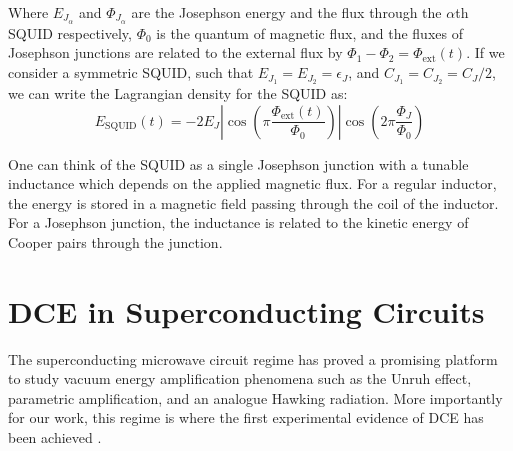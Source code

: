 \noindent
Where $E_{J_\alpha}$ and $\Phi_{J_\alpha}$ are the Josephson energy and the flux through the $\alpha$th SQUID respectively, $\Phi_0$ is the quantum of magnetic flux, and the fluxes of Josephson junctions are related to the external flux by $\Phi_1 - \Phi_2  = \Phi_{\text{ext}}(t)$. If we consider a symmetric SQUID, such that $E_{J_1} = E_{J_2} = \epsilon_J$, and
$C_{J_1} = C_{J_2} = C_J/2$, we can write the Lagrangian density for the SQUID as:
%
\begin{equation}\label{eq:squid_energy_symm}
    E_{\text{SQUID}}(t) = -2E_J \left|\cos\left(\pi\frac{\Phi_{\text{ext}}(t)}{\Phi_0}\right)\right|
    \cos\left(2\pi \frac{\Phi_J}{\Phi_0} \right)
\end{equation}

\newpage
\noindent
One can think of the SQUID as a single Josephson junction with a tunable inductance which depends on the applied magnetic flux. For a regular inductor, the energy is stored in a magnetic field passing through the coil of the inductor. For a Josephson junction, the inductance is related to the kinetic energy of Cooper pairs through the junction.


\section{DCE in Superconducting Circuits}\label{sec:DCE_in_SC}

The superconducting microwave circuit regime has proved a promising platform to study vacuum energy amplification phenomena \cite{Nation2011} such as the Unruh effect, parametric amplification, and an analogue Hawking radiation. More importantly for our work, this regime is where the first experimental evidence of DCE has been achieved \cite{Wilson2011_ObservationDCE}. 

